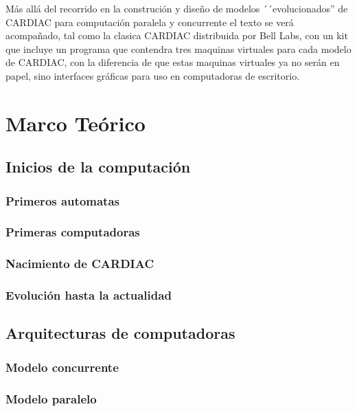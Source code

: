 \documentclass[letterpaper,12pt,oneside]{book}
\begin{document}
	
	Más allá del recorrido en la construción y diseño de modelos ´´evolucionados'' de CARDIAC para computación paralela y concurrente el texto se verá acompañado,
	tal como la clasica CARDIAC distribuida por Bell Labs, con un kit que incluye un programa que contendra tres maquinas virtuales para cada
	modelo de CARDIAC, con la diferencia de que estas maquinas virtuales ya no serán en papel, sino interfaces gráficas para uso en computadoras de escritorio.



\tableofcontents
\listoffigures

\mainmatter

\chapter{Marco Teórico} %


\section{Inicios de la computación}
	\subsection{Primeros automatas}
	\subsection{Primeras computadoras}
	\subsection{Nacimiento de CARDIAC}
	\subsection{Evolución hasta la actualidad}
   
\section{Arquitecturas de computadoras}   
   
\subsection{Modelo concurrente}

\subsection{Modelo paralelo}
\end{document}
